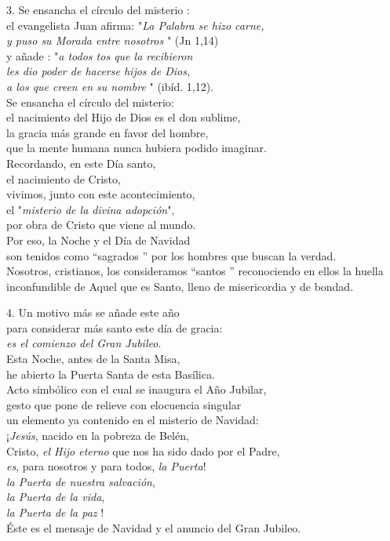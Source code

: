 3. Se ensancha el círculo del misterio :\\
el evangelista Juan afirma: "\emph{La Palabra se hizo carne,\\
	y puso su Morada entre nosotros} " (Jn 1,14)\\
y añade : "\emph{a todos tos que la recibieron\\
	les dio poder de hacerse hijos de Dios,\\
	a los que creen en su nombre} " (ibíd. 1,12).\\
Se ensancha el círculo del misterio:\\
el nacimiento del Hijo de Dios es el don sublime,\\
la gracia más grande en favor del hombre,\\
que la mente humana nunca hubiera podido imaginar.\\
Recordando, en este Día santo,\\
el nacimiento de Cristo,\\
vivimos, junto con este acontecimiento,\\
el "\emph{misterio de la divina adopción}",\\
por obra de Cristo que viene al mundo.\\
Por eso, la Noche y el Día de Navidad\\
son tenidos como ``sagrados '' por los hombres que buscan la verdad.\\
Nosotros, cristianos, los consideramos ``santos '' reconociendo en ellos
la huella inconfundible de Aquel que es Santo, lleno de misericordia y
de bondad.

4. Un motivo más se añade este año\\
para considerar más santo este día de gracia:\emph{\\
	es el comienzo del Gran Jubileo}.\\
Esta Noche, antes de la Santa Misa,\\
he abierto la Puerta Santa de esta Basílica.\\
Acto simbólico con el cual se inaugura el Año Jubilar,\\
gesto que pone de relieve con elocuencia singular\\
un elemento ya contenido en el misterio de Navidad:\\
¡\emph{Jesús}, nacido en la pobreza de Belén,\\
Cristo, \emph{el Hijo eterno} que nos ha sido dado por el Padre,\emph{\\
	es}, para nosotros y para todos, \emph{la Puerta}!\emph{\\
	la Puerta de nuestra salvación},\emph{\\
	la Puerta de la vida},\emph{\\
	la Puerta de la paz} !\\
Éste es el mensaje de Navidad y el anuncio del Gran Jubileo.

